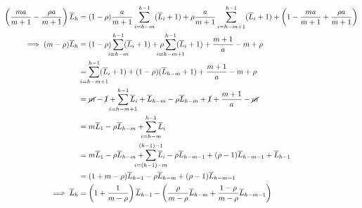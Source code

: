 \begin{align}
    \left(\frac{ma}{m+1} - \frac{\rho a}{m+1}\right)\L_h
&= (1-\rho)\frac{a}{m+1}\sum_{i=h-m}^{h-1} (\L_i+1) + \rho\frac{a}{m+1}\sum_{i=h-m+1}^{h-1} (\L_i+1) + \left( 1 - \frac{ma}{m+1} + \frac{\rho a}{m+1}\right)\nonumber\\
    \implies (m-\rho)\L_h
    &= (1-\rho)\sum_{\mathclap{i=h-m}}^{h-1} (\L_i+1) + \rho\sum_{\mathclap{i=h-m+1}}^{h-1} (\L_i+1) + \frac{m+1}{a} - m + \rho\nonumber\\
    &= \sum_{\mathclap{i=h-m+1}}^{h-1} (\L_i+1) + (1-\rho)(\L_{h-m}+1) + \frac{m+1}{a} - m + \rho\nonumber\\
    &= \cancel{m} -\cancel{1} + \sum_{\mathclap{i=h-m+1}}^{h-1} \L_i + \L_{h-m} - \rho\L_{h-m} +\cancel{1} + \frac{m+1}{a} - \cancel{m}\nonumber\\
    &= m\L_1 - \rho\L_{h-m} + \sum_{\mathclap{i=h-m}}^{h-1} \L_i\nonumber\\
    &= m\L_1 - \rho\L_{h-m} + \sum_{\mathclap{i=(h-1)-m}}^{\mathclap{(h-1)-1}} \L_i - \rho\L_{h-m-1} + (\rho-1)\L_{h-m-1} + \L_{h-1}\nonumber\\
    &= (1 + m-\rho)\L_{h-1} - \rho\L_{h-m} + (\rho-1)\L_{h-m-1}\nonumber\\
    \implies \L_h &= \left(1 + \frac{1}{m-\rho}\right)\L_{h-1} - \left(\frac{\rho}{m-\rho}\L_{h-m} + \frac{1-\rho}{m-\rho}\L_{h-m-1}\right)\nonumber\\
\end{align}


